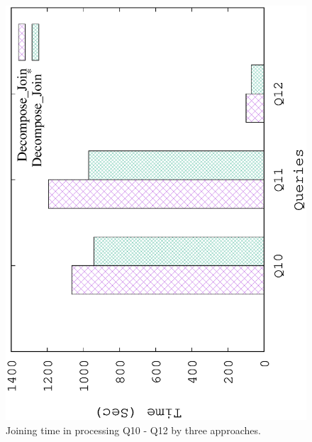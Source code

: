 \begin{figure}[H]
	\centering
	\includegraphics[scale=0.5, angle=270]{plot/threejoin.eps}
	\caption{Joining time in processing Q10 - Q12 by three approaches.}
	\label{fig:threejoin}
\end{figure}
